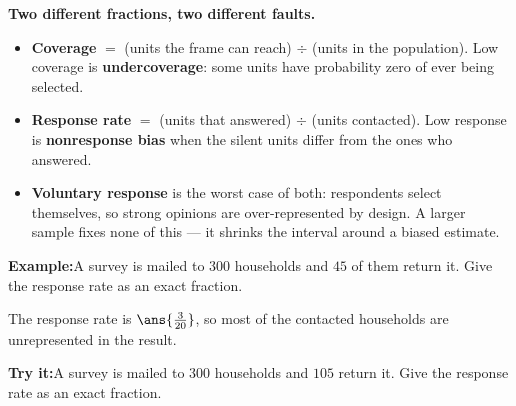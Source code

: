 \documentclass[12pt]{article}
\begin{document}


\begin{formulabox}
\textbf{Two different fractions, two different faults.}
\begin{itemize}[leftmargin=0.8cm, itemsep=1pt, topsep=2pt]
  \item \textbf{Coverage} $=$ (units the frame can reach) $\div$ (units in the
        population). Low coverage is \textbf{undercoverage}: some units have
        probability zero of ever being selected.
  \item \textbf{Response rate} $=$ (units that answered) $\div$ (units contacted).
        Low response is \textbf{nonresponse bias} when the silent units differ
        from the ones who answered.
  \item \textbf{Voluntary response} is the worst case of both: respondents
        select themselves, so strong opinions are over-represented by design. A
        larger sample fixes none of this --- it shrinks the interval around a
        biased estimate.
\end{itemize}
\end{formulabox}

\begin{examplebox}
\textbf{Example:}\quad A survey is mailed to $300$ households and $45$ of them
return it. Give the response rate as an exact fraction.



The response rate is $\ans{\tfrac{3}{20}}$, so most of the contacted households
are unrepresented in the result.
\end{examplebox}

\begin{tryitbox}
\textbf{Try it:}\quad A survey is mailed to $300$ households and $105$ return it.
Give the response rate as an exact fraction.

\end{tryitbox}

\end{document}

